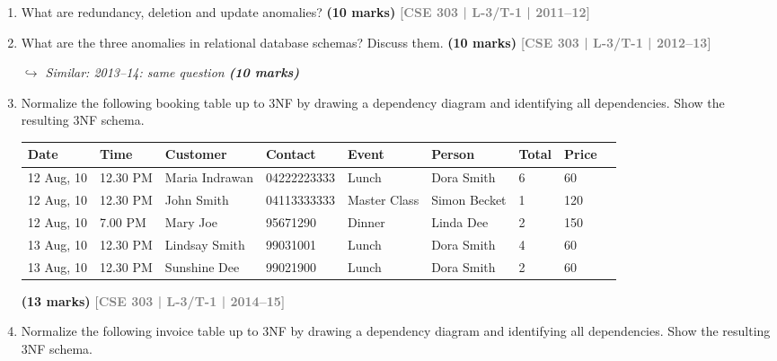 \documentclass[12pt,a3paper]{article}
\newcommand{\yr}[1]{\hfill\textcolor{gray}{\small\textbf{[#1]}}}
\newcommand{\mk}[1]{\textcolor{orange!70!black}{\small\textbf{(#1 marks)}}}
\newcommand{\variant}[1]{\par\vspace{1pt}\textcolor{blue!50!black}%
  {\footnotesize\textit{$\hookrightarrow$ Similar: #1}}}
\begin{document}
\begin{enumerate}

\item What are redundancy, deletion and update anomalies?
\mk{10} \yr{CSE 303 | L-3/T-1 | 2011--12}

\item What are the three anomalies in relational database schemas? Discuss them.
\mk{10} \yr{CSE 303 | L-3/T-1 | 2012--13}

\variant{2013--14: same question \mk{10}}

\item Normalize the following booking table up to 3NF by drawing a dependency diagram and identifying all dependencies. Show the resulting 3NF schema.

\medskip
\begin{center}
\small
\begin{tabular}{lllllllll}
\toprule
\textbf{Date} & \textbf{Time} & \textbf{Customer} & \textbf{Contact} & \textbf{Event} & \textbf{Person} & \textbf{Total} & \textbf{Price}\\
\midrule
12 Aug, 10 & 12.30 PM & Maria Indrawan & 04222223333 & Lunch & Dora Smith & 6 & 60\\
12 Aug, 10 & 12.30 PM & John Smith & 04113333333 & Master Class & Simon Becket & 1 & 120\\
12 Aug, 10 & 7.00 PM & Mary Joe & 95671290 & Dinner & Linda Dee & 2 & 150\\
13 Aug, 10 & 12.30 PM & Lindsay Smith & 99031001 & Lunch & Dora Smith & 4 & 60\\
13 Aug, 10 & 12.30 PM & Sunshine Dee & 99021900 & Lunch & Dora Smith & 2 & 60\\
\bottomrule
\end{tabular}
\end{center}
\mk{13} \yr{CSE 303 | L-3/T-1 | 2014--15}

\item Normalize the following invoice table up to 3NF by drawing a dependency diagram and identifying all dependencies. Show the resulting 3NF schema.


\end{enumerate}
\end{document}
